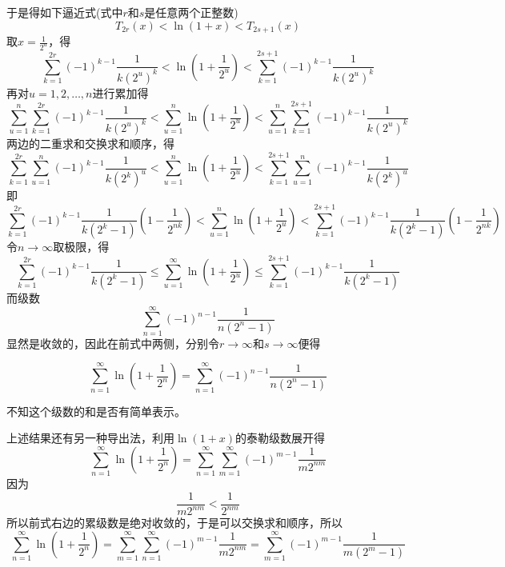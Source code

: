 \documentclass{ctexart}
\begin{document}
于是得如下逼近式(式中$r$和$s$是任意两个正整数)
\[ T_{2r}(x) < \ln{(1+x)} < T_{2s+1}(x) \]
取$x=\frac{1}{2^u}$，得
\[ \sum_{k=1}^{2r} (-1)^{k-1} \frac{1}{k(2^u)^k} < \ln{\left( 1+\frac{1}{2^u} \right) < \sum_{k=1}^{2s+1} (-1)^{k-1} \frac{1}{k(2^u)^k}} \]
再对$u=1,2,\ldots,n$进行累加得
\[ \sum_{u=1}^n \sum_{k=1}^{2r} (-1)^{k-1} \frac{1}{k(2^u)^k} < \sum_{u=1}^n \ln{\left( 1+\frac{1}{2^u} \right) < \sum_{u=1}^{n} \sum_{k=1}^{2s+1} (-1)^{k-1} \frac{1}{k(2^u)^k}} \]
两边的二重求和交换求和顺序，得
\[  \sum_{k=1}^{2r} \sum_{u=1}^n (-1)^{k-1} \frac{1}{k(2^k)^u} < \sum_{u=1}^n \ln{\left( 1+\frac{1}{2^u} \right) <  \sum_{k=1}^{2s+1} \sum_{u=1}^{n}(-1)^{k-1} \frac{1}{k(2^k)^u}} \]
即
\[ \sum_{k=1}^{2r} (-1)^{k-1} \frac{1}{k(2^k-1)} \left( 1-\frac{1}{2^{nk}} \right) < \sum_{u=1}^n \ln{\left( 1+\frac{1}{2^u} \right)} < \sum_{k=1}^{2s+1} (-1)^{k-1} \frac{1}{k(2^k-1)} \left( 1-\frac{1}{2^{nk}} \right)\]
令$n\to\infty$取极限，得
\[ \sum_{k=1}^{2r} (-1)^{k-1} \frac{1}{k(2^k-1)} \leqslant \sum_{u=1}^{\infty} \ln{\left( 1+\frac{1}{2^u} \right)} \leqslant \sum_{k=1}^{2s+1} (-1)^{k-1} \frac{1}{k(2^k-1)} \]
而级数
\[ \sum_{n=1}^{\infty} (-1)^{n-1} \frac{1}{n(2^n-1)} \]
显然是收敛的，因此在前式中两侧，分别令$r \to \infty$和$s \to \infty$便得
\begin{statement}
\[ \sum_{n=1}^{\infty} \ln{\left( 1+\frac{1}{2^n} \right)} = \sum_{n=1}^{\infty} (-1)^{n-1} \frac{1}{n(2^n-1)} \]
\end{statement}
不知这个级数的和是否有简单表示。

上述结果还有另一种导出法，利用$\ln{(1+x)}$的泰勒级数展开得
\[ \sum_{n=1}^{\infty} \ln{\left( 1+\frac{1}{2^n} \right)} = \sum_{n=1}^{\infty} \sum_{m=1}^{\infty} (-1)^{m-1} \frac{1}{m2^{nm}} \]
因为
\[ \frac{1}{m2^{nm}} < \frac{1}{2^{nm}} \]
所以前式右边的累级数是绝对收敛的，于是可以交换求和顺序，所以
\[ \sum_{n=1}^{\infty} \ln{\left( 1+\frac{1}{2^n} \right)} =  \sum_{m=1}^{\infty} \sum_{n=1}^{\infty}(-1)^{m-1} \frac{1}{m2^{nm}} = \sum_{m=1}^{\infty} (-1)^{m-1}\frac{1}{m(2^m-1)} \]
\end{document}
